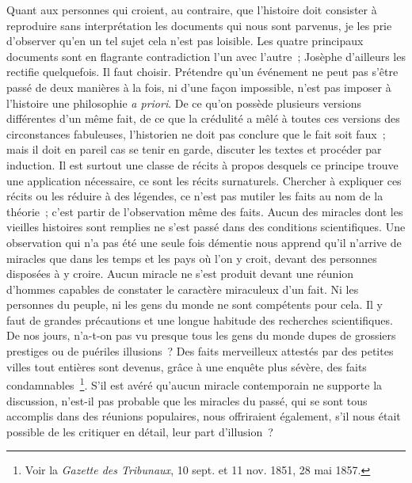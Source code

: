 \documentclass[french,twoside]{book} %
\begin{document}
Quant aux personnes qui croient, au contraire, que l’histoire doit consister à reproduire sans interprétation les documents qui nous sont parvenus, je les prie d’observer qu’en un tel sujet cela n’est pas loisible. Les quatre principaux documents sont en flagrante contradiction l’un avec l’autre ; Josèphe d’ailleurs les rectifie quelquefois. Il faut choisir. Prétendre qu’un événement ne peut pas s’être passé de deux manières à la fois, ni d’une façon impossible, n’est pas imposer à l’histoire une philosophie {\itshape a priori}. De ce qu’on possède plusieurs versions différentes d’un même fait, de ce que la crédulité a mêlé à toutes ces versions des circonstances fabuleuses, l’historien ne doit pas conclure que le fait soit faux ; mais il doit en pareil cas se tenir en garde, discuter les textes et procéder par induction. Il est surtout une classe de récits à propos desquels ce principe trouve une application nécessaire, ce sont les récits surnaturels. Chercher à expliquer ces récits ou les réduire à des légendes, ce n’est pas mutiler les faits au nom de la théorie ; c’est partir de l’observation même des faits. Aucun des miracles dont les vieilles histoires sont remplies ne s’est passé dans des conditions scientifiques. Une observation qui n’a pas été une seule fois démentie nous apprend qu’il n’arrive de miracles que dans les temps et les pays où l’on y croit, devant des personnes disposées à y croire. Aucun miracle ne s’est produit devant une réunion d’hommes capables de constater le caractère miraculeux d’un fait. Ni les personnes du peuple, ni les gens du monde ne sont compétents pour cela. Il y faut de grandes précautions et une longue habitude des recherches scientifiques. De nos jours, n’a-t-on pas vu presque tous les gens du monde dupes de grossiers prestiges ou de puériles illusions ? Des faits merveilleux attestés par des petites villes tout entières sont devenus, grâce à une enquête plus sévère, des faits condamnables \footnote{ Voir la {\itshape Gazette des Tribunaux}, 10 sept. et 11 nov. 1851, 28 mai 1857.}. S’il est avéré qu’aucun miracle contemporain ne supporte la discussion, n’est-il pas probable que les miracles du passé, qui se sont tous accomplis dans des réunions populaires, nous offriraient également, s’il nous était possible de les critiquer en détail, leur part d’illusion ?\par
\end{document}
